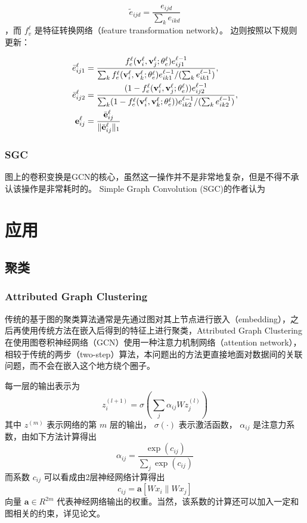 \documentclass[color=gray,base=hide,cn]{elegantbook}
\begin{document}
\begin{equation}
    {\tilde e}_{ijd} = \frac{e_{ijd}}{\sum_{k}e_{ikd}}
\end{equation}
，而 $f_v^{\ell}$ 是特征转换网络（feature transformation network）。
边则按照以下规则更新：

\begin{align}
    {\bar e}_{ij1}^{\ell} & = \frac{f_{e}^{\ell}({\bf v}_{i}^{\ell}, {\bf v}_{j}^{\ell}; \theta_e^{\ell})e_{ij1}^{\ell-1}}{\sum_{k}f_{e}^{\ell}({\bf v}_{i}^{\ell}, {\bf v}_{k}^{\ell}; \theta_e^{\ell})e_{ik1}^{\ell-1}/(\sum_{k}e_{ik1}^{\ell-1})},        \\
    {\bar e}_{ij2}^{\ell} & =\frac{(1-f_{e}^{\ell}({\bf v}_{i}^{\ell}, {\bf v}_{j}^{\ell}; \theta_e^{\ell}))e_{ij2}^{\ell-1}}{\sum_{k}(1-f_{e}^{\ell}({\bf v}_{i}^{\ell}, {\bf v}_{k}^{\ell}; \theta_e^{\ell}))e_{ik2}^{\ell-1}/(\sum_{k}e_{ik2}^{\ell-1})},
    \\
    {\bf e}_{ij}^{\ell}   & = \frac{{\bar {\bf e}}_{ij}^{\ell}} {\|{\bar {\bf e}}_{ij}^{\ell}\|_1}
\end{align}


\section{SGC}
图上的卷积变换是GCN的核心，虽然这一操作并不是非常地复杂，但是不得不承认该操作是非常耗时的。 Simple Graph Convolution (SGC)\cite{wu2019simplifying}的作者认为

\part{应用}
\chapter{聚类}
\section{Attributed Graph Clustering}
传统的基于图的聚类算法通常是先通过图对其上节点进行嵌入（embedding），之后再使用传统方法在嵌入后得到的特征上进行聚类，Attributed Graph Clustering\cite{wang2019attributed} 在使用图卷积神经网络（GCN）使用一种注意力机制网络（attention network），相较于传统的两步（two-step）算法，本问题出的方法更直接地面对数据间的关联问题，而不会在嵌入这个地方绕个圈子。

每一层的输出表示为
\begin{equation}
    z^{(l+1)}_i = \sigma(\sum_j \alpha_{ij} W z^{(l)}_j)
\end{equation}
其中 $z^{(m)}$ 表示网络的第 $m$ 层的输出， $\sigma(\cdot)$ 表示激活函数， $\alpha_{ij}$ 是注意力系数，由如下方法计算得出
\begin{equation}
    \alpha_{ij} = \frac{\exp (c_{ij})}{\sum_j \exp (c_{ij})}
\end{equation}
而系数 $c_{ij}$ 可以看成由2层神经网络计算得出
\begin{equation}
    c_{ij} = \mathbf{a} [W x_i\| W x_j]
\end{equation}
向量 $\mathbf{a} \in {R}^{2m}$ 代表神经网络输出的权重。当然，该系数的计算还可以加入一定和图相关的约束，详见论文。
\end{document}
